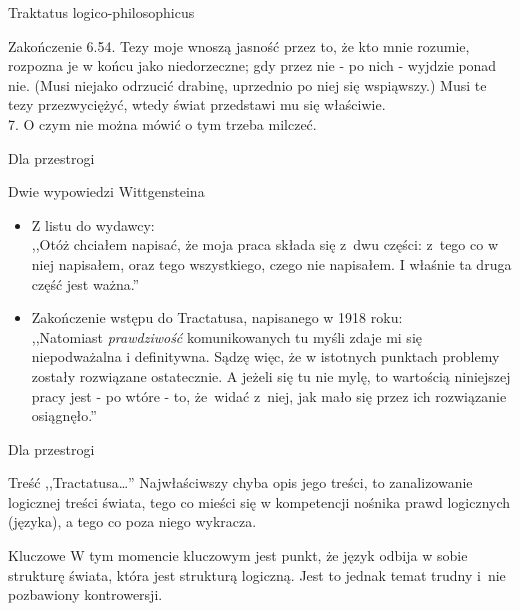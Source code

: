 \begin{frame}{Traktatus logico-philosophicus}
\begin{block}{Zakończenie}
6.54. Tezy moje wnoszą jasność przez to, że kto mnie rozumie, rozpozna je w końcu jako niedorzeczne; gdy przez nie - po nich - wyjdzie ponad nie. (Musi niejako odrzucić drabinę, uprzednio po niej się wspiąwszy.) Musi te tezy przezwyciężyć, wtedy świat przedstawi mu się właściwie.\\
7. O czym nie można mówić o tym trzeba milczeć.
\end{block}
\end{frame}

\begin{frame}{Dla przestrogi}
\begin{block}{Dwie wypowiedzi Wittgensteina}
\begin{itemize}
\pause
\item Z listu do wydawcy:\\
,,Otóż chciałem napisać, że moja praca składa się z~dwu części: z~tego co w niej napisałem, oraz tego wszystkiego, czego nie napisałem. I właśnie ta druga część jest ważna.''
\pause
\item Zakończenie wstępu do Tractatusa, napisanego w 1918 roku:\\
,,Natomiast \emph{prawdziwość} komunikowanych tu myśli zdaje mi się niepodważalna i definitywna. Sądzę więc, że w istotnych punktach problemy zostały rozwiązane ostatecznie. A jeżeli się tu nie mylę, to wartością niniejszej pracy jest - po wtóre - to, że~widać z~niej, jak mało się przez ich rozwiązanie osiągnęło.''
\end{itemize}
\end{block}
\end{frame}

\begin{frame}{Dla przestrogi}
\begin{block}{Treść ,,Tractatusa\ldots ''}
Najwłaściwszy chyba opis jego treści, to zanalizowanie logicznej treści świata, tego co mieści się w kompetencji nośnika prawd logicznych (języka), a tego co poza niego wykracza.
\end{block}

\begin{block}{Kluczowe}
W tym momencie kluczowym jest punkt, że język odbija w sobie strukturę świata, która jest strukturą logiczną. Jest to jednak temat trudny i~nie pozbawiony kontrowersji.
\end{block}
\end{frame}


